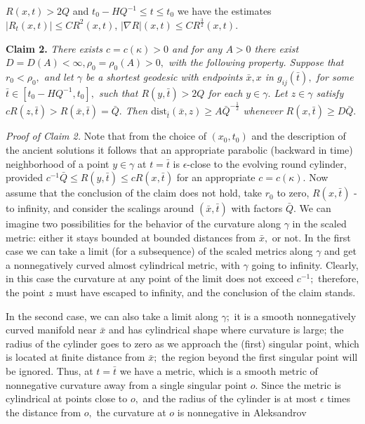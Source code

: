 \documentclass[12pt]{article}
\newcommand{\e}{\epsilon}
\newcommand{\bx}{\bar{x}}
\newcommand{\bt}{\bar{t}}
\theoremstyle{plain}
{\swapnumbers
\newtheorem{thm}{Theorem}[section]
\newtheorem{cor}[thm]{Corollary}
\newtheorem{lem}[thm]{Lemma}
\newtheorem{prop}[thm]{Proposition}
}
\theoremstyle{definition}
{\swapnumbers
\newtheorem{defn}[thm]{Definition}
\newtheorem{nota}[thm]{Notation}
\newtheorem{parag}[thm]{}
\newtheorem*{parstr}{\addtocounter{thm}{1}\thesection.\arabic{thm}*}
\newtheorem*{intropar}{\addtocounter{thm}{1}\arabic{thm}}
}
\theoremstyle{remark} {\swapnumbers
\newtheorem{rem}[thm]{Remark}
\newtheorem{exam}[thm]{Example}
\newtheorem{lemma}[thm]{Lemma}
\newtheorem{claim}[thm]{Claim}
}
\numberwithin{equation}{section}
\begin{document}
    $R(x,t)>2Q$ and $t_0-HQ^{-1}\le t\le t_0$ we have the estimates $|R_t(x,t)|\le
    CR^2(x,t)$, $
    |\nabla R|(x,t)\le CR^{\frac{3}{2}}(x,t).$ \par {\bf Claim 2.} {\it There
    exists $c=c(\kappa)>0$ and for any $A>0$ there exist
    $D=D(A)<\infty , \rho_0=\rho_0(A)>0,$ with the following
    property. Suppose that $r_0<\rho_0,$ and let $\gamma$ be a
    shortest geodesic with endpoints $\bx,x$ in $g_{ij}(\bt), $
    for some $\bt\in[t_0-HQ^{-1},t_0],$ such that $R(y,\bt)>2Q$ for
    each $y\in\gamma.$ Let $z\in\gamma$ satisfy
    $cR(z,\bt)>R(\bx,\bt)=\bar{Q}.$ Then
    $\mbox{dist}_{\bt}(\bx,z)\ge A\bar{Q}^{-\frac{1}{2}}$ whenever
    $R(x,\bt)\ge D\bar{Q}.$} \par {\it Proof of Claim 2.}  Note that from the choice
    of $(x_0,t_0)$ and the description of the ancient solutions it
    follows that an appropriate parabolic (backward in time)
    neighborhood of a point $y\in\gamma$ at $t=\bt$ is $\e$-close to the
    evolving round cylinder, provided $c^{-1}\bar{Q}\le
    R(y,\bt)\le cR(x,\bt)$ for an appropriate $c=c(\kappa).$ Now
    assume that the conclusion of the claim does not hold, take
    $r_0$ to zero, $R(x,\bt)$ - to infinity, and consider the
    scalings
    around $(\bx,\bt)$ with factors $\bar{Q}.$ We can imagine two
    possibilities for the behavior of the curvature along $\gamma$
    in the scaled metric: either it stays bounded at bounded
    distances from $\bx,$ or not. In the first case we can take a
    limit (for a subsequence) of the scaled metrics along
    $\gamma$ and get a nonnegatively curved almost cylindrical
    metric, with $\gamma$ going to infinity. Clearly, in this case
    the curvature at any point of the limit does not exceed
    $c^{-1};$ therefore, the point $z$ must have escaped to
    infinity, and the conclusion of the claim stands. \par In the
    second case, we can also take a limit along $\gamma;$ it is a
    smooth nonnegatively curved manifold near $\bx$ and has
    cylindrical shape where curvature is large; the radius of the
    cylinder goes to zero as we approach the (first) singular
    point, which is located at finite distance from $\bx;$ the
    region beyond the first singular point will be ignored. Thus,
    at $t=\bt$ we have a metric, which is a  smooth metric of
    nonnegative curvature away from a single singular point $o$.
    Since the metric is cylindrical at points close to $o,$ and
    the radius of the cylinder is at most $\e$ times the distance
    from $o,$ the curvature at $o$ is nonnegative in Aleksandrov
\end{document}
